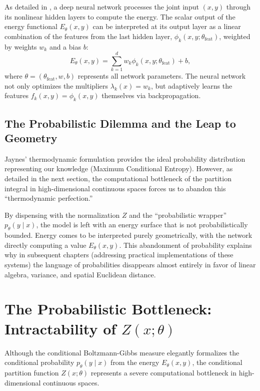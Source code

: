 \documentclass[11pt, oneside, openany]{book}
\begin{document}
As detailed in , a deep neural network processes the joint input $(x,y)$ through its nonlinear hidden layers to compute the energy. The scalar output of the energy functional $E_{\theta}(x,y)$ can be interpreted at its output layer as a linear combination of the features from the last hidden layer, $\phi_{k}(x,y;\theta_{\text{feat}})$, weighted by weights $w_{k}$ and a bias $b$:
\begin{equation}
\label{eq:2.10}
E_{\theta}(x,y) = \sum_{k=1}^{d} w_{k} \phi_{k}(x,y;\theta_{\text{feat}}) + b,
\end{equation}
where $\theta = (\theta_{\text{feat}}, w, b)$ represents all network parameters. The neural network not only optimizes the multipliers $\lambda_{k}(x) = w_{k}$, but adaptively learns the features $f_{k}(x,y) = \phi_{k}(x,y)$ themselves via backpropagation.

\subsection{The Probabilistic Dilemma and the Leap to Geometry}
\label{sec:2.3.2}

Jaynes' thermodynamic formulation provides the ideal probability distribution representing our knowledge (Maximum Conditional Entropy). However, as detailed in the next section, the computational bottleneck of the partition integral in high-dimensional continuous spaces forces us to abandon this ``thermodynamic perfection.''

By dispensing with the normalization $Z$ and the ``probabilistic wrapper'' $p_{\theta}(y \mid x)$, the model is left with an energy surface that is not probabilistically bounded. Energy comes to be interpreted purely geometrically, with the network directly computing a value $E_{\theta}(x,y)$. This abandonment of probability explains why in subsequent chapters (addressing practical implementations of these systems) the language of probabilities disappears almost entirely in favor of linear algebra, variance, and spatial Euclidean distance.

\section{The Probabilistic Bottleneck: Intractability of $Z(x;\theta)$}
\label{sec:2.4}

Although the conditional Boltzmann-Gibbs measure elegantly formalizes the conditional probability $p_{\theta}(y \mid x)$ from the energy $E_{\theta}(x,y)$, the conditional partition function $Z(x;\theta)$ represents a severe computational bottleneck in high-dimensional continuous spaces.
\end{document}
